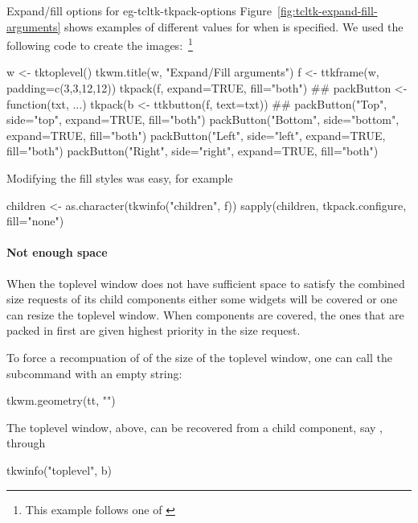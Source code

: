 \begin{example}{Expand/fill options for }{eg-tcltk-tkpack-options}
Figure~\ref{fig:tcltk-expand-fill-arguments} shows examples of
different values for  when  is
specified. We used the following code to create the
images:~\footnote{This example follows one of \citep{Walsh}}
\begin{Schunk}
\begin{Sinput}
 w <- tktoplevel()
 tkwm.title(w, "Expand/Fill arguments")
 f <- ttkframe(w, padding=c(3,3,12,12))
 tkpack(f, expand=TRUE, fill="both")
 ##
 packButton <- function(txt, ...) 
   tkpack(b <- ttkbutton(f, text=txt))
 ##
 packButton("Top",    side="top",    expand=TRUE, fill="both") 
 packButton("Bottom", side="bottom", expand=TRUE, fill="both") 
 packButton("Left",   side="left",   expand=TRUE, fill="both") 
 packButton("Right",  side="right",  expand=TRUE, fill="both") 
\end{Sinput}
\end{Schunk}
%

Modifying the fill styles was easy, for example
\begin{Schunk}
\begin{Sinput}
 children <- as.character(tkwinfo("children", f))
 sapply(children, tkpack.configure, fill="none")
\end{Sinput}
\end{Schunk}
\end{example}



\paragraph{Not enough space}
When the toplevel window does not have sufficient space to satisfy the
combined size requests of its child components either some
widgets will be covered or one can resize the toplevel window.
When components are covered, the ones that are packed in first are given
highest priority in the size request.

To force a recompuation of of the size of the toplevel window, one can
call the  subcommand with an empty string:
\begin{Schunk}
\begin{Sinput}
 tkwm.geometry(tt, "")
\end{Sinput}
\end{Schunk}
%
The toplevel window,  above, can be recovered from a child
component, say , through
\begin{Schunk}
\begin{Sinput}
 tkwinfo("toplevel", b)
\end{Sinput}
\end{Schunk}


